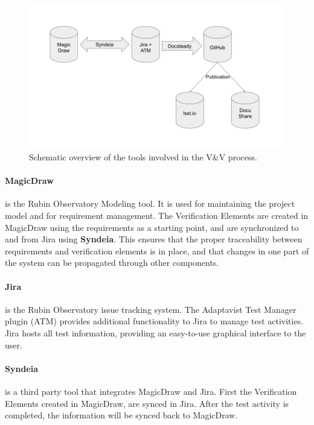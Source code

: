 \begin{figure}
\begin{center}
\includegraphics[width=\textwidth]{imgs/VandVtools.png}
 \caption{Schematic overview of the tools involved in the V\&V process.}
 \label{fig:vandvtools}
\end{center}
\end{figure}

\paragraph{MagicDraw}
is the Rubin Observatory Modeling tool. It is used for maintaining the project model and for requirement management.
The Verification Elements are created in MagicDraw using the requirements as a starting point,
and are synchronized to and from Jira using \textbf{Syndeia}.
This ensures that the proper traceability between requirements and verification elements is in place,
and that changes in one part of the system can be propagated through other components.

\paragraph{Jira}
is the Rubin Observatory issue tracking system.
The Adaptavist Test Manager plugin (ATM) provides additional functionality to Jira to manage test activities.
Jira hosts all test information, providing an easy-to-use graphical interface to the user.

\paragraph{Syndeia}
is a third party tool that integrates MagicDraw and Jira. First the Verification Elements created in MagicDraw,
are synced in Jira. After the test activity is completed, the information will be synced back to MagicDraw.

